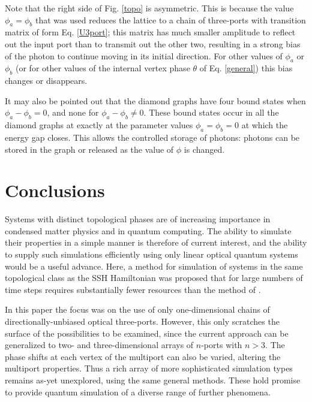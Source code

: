\documentclass[twocolumn,amsmath, amssymb, superscriptaddress, pra]{revtex4}
\begin{document}

Note that the right side of Fig. \ref{topo} is asymmetric. This is because
the value $\phi_a=\phi_b$ that was used reduces the lattice to a chain of
three-ports with transition matrix of form  Eq. \ref{U3port}; this matrix has
much smaller amplitude to reflect out the input port than to transmit out the
other two, resulting in a strong bias of the photon to continue moving in its
initial direction. For other values of $\phi_a$ or $\phi_b$ (or for other
values of the internal vertex phase $\theta$ of Eq. \ref{general}) this bias
changes or disappears.

It may also be pointed out that the diamond graphs have four bound states \cite{fh2}  when $\phi_a-\phi_b =0$, and none for $\phi_a-\phi_b\ne 0$. These bound states occur in all the diamond graphs at exactly at the parameter values $\phi_a=\phi_b=0$ at which the energy gap closes. This allows the
controlled storage of photons: photons can be stored in the graph or released as the value of $\phi $ is changed.



\section{Conclusions}\label{conclude}

Systems with distinct topological phases are of increasing importance in
condensed matter physics and in quantum computing. The ability to simulate
their properties in a simple manner is therefore of current interest, and the
ability to supply such simulations efficiently using only linear optical
quantum systems would be a useful advance. Here, a method for simulation of
systems in the same topological class as the SSH Hamiltonian was proposed
that for large numbers of time steps requires substantially fewer resources
than the method of \cite{kit3}.

In this paper the focus was on the use of only one-dimensional chains of directionally-unbiased optical three-ports. However, this only scratches the surface of
the possibilities to be examined, since the current approach can be generalized to two- and three-dimensional arrays of $n$-ports with $n>3$. The phase shifts at each vertex of the multiport can also be varied, altering the multiport properties. Thus a rich array
of more sophisticated simulation types remains as-yet unexplored, using the same general methods. These hold promise to provide quantum simulation of a diverse
range of further phenomena.
\end{document}
